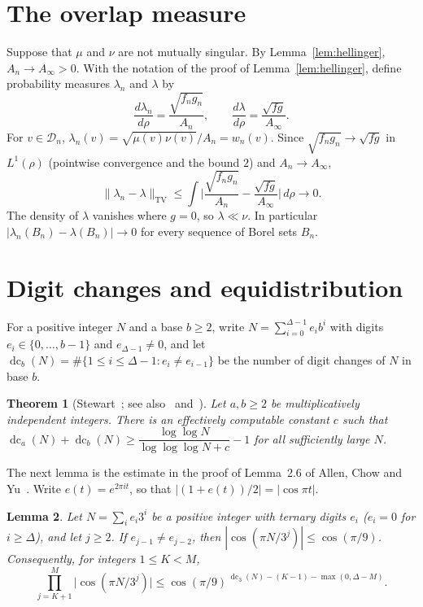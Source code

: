 \documentclass[11pt]{amsart}
\newtheorem{theorem}{Theorem}[section]
\newtheorem{lemma}[theorem]{Lemma}
\theoremstyle{remark}
\newcommand{\cD}{\mathcal D}
\newcommand{\TV}{\mathrm{TV}}
\DeclareMathOperator{\dc}{dc}
\begin{document}
\section{The overlap measure}\label{sec:overlap}

Suppose that $\mu$ and $\nu$ are not mutually singular. By Lemma~\ref{lem:hellinger}, $A_n\to A_\infty>0$. With the notation of the proof of Lemma~\ref{lem:hellinger}, define probability measures $\lambda_n$ and $\lambda$ by
\[
\frac{d\lambda_n}{d\rho}=\frac{\sqrt{f_ng_n}}{A_n},\qquad\frac{d\lambda}{d\rho}=\frac{\sqrt{fg}}{A_\infty}.
\]
For $v\in\cD_n$, $\lambda_n(v)=\sqrt{\mu(v)\nu(v)}/A_n=w_n(v)$. Since $\sqrt{f_ng_n}\to\sqrt{fg}$ in $L^1(\rho)$ (pointwise convergence and the bound $2$) and $A_n\to A_\infty$,
\begin{equation}\label{eq:tv}
\|\lambda_n-\lambda\|_{\TV}\le\int\Big|\frac{\sqrt{f_ng_n}}{A_n}-\frac{\sqrt{fg}}{A_\infty}\Big|\,d\rho\longrightarrow0.
\end{equation}
The density of $\lambda$ vanishes where $g=0$, so $\lambda\ll\nu$. In particular $|\lambda_n(B_n)-\lambda(B_n)|\to0$ for every sequence of Borel sets $B_n$.

\section{Digit changes and equidistribution}\label{sec:mixing}

For a positive integer $N$ and a base $b\ge2$, write $N=\sum_{i=0}^{\Delta-1}e_ib^i$ with digits $e_i\in\{0,\dots,b-1\}$ and $e_{\Delta-1}\ne0$, and let $\dc_b(N)=\#\{1\le i\le\Delta-1:e_i\ne e_{i-1}\}$ be the number of digit changes of $N$ in base $b$.

\begin{theorem}[{Stewart~\cite{Stewart}; see also~\cite{BCM} and~\cite[Theorem~6.9]{Bugeaud}}]\label{thm:stewart}
Let $a,b\ge2$ be multiplicatively independent integers. There is an effectively computable constant $c$ such that $\dc_a(N)+\dc_b(N)\ge\dfrac{\log\log N}{\log\log\log N+c}-1$ for all sufficiently large $N$.
\end{theorem}

The next lemma is the estimate in the proof of Lemma~2.6 of Allen, Chow and Yu~\cite{ACY}. Write $e(t)=e^{2\pi it}$, so that $|(1+e(t))/2|=|\cos\pi t|$.

\begin{lemma}\label{lem:digits}
Let $N=\sum_ie_i3^i$ be a positive integer with ternary digits $e_i$ \textup{(}$e_i=0$ for $i\ge\Delta$\textup{)}, and let $j\ge2$. If $e_{j-1}\ne e_{j-2}$, then $|\cos(\pi N/3^j)|\le\cos(\pi/9)$. Consequently, for integers $1\le K<M$,
\[
\prod_{j=K+1}^M\big|\cos(\pi N/3^j)\big|\le\cos(\pi/9)^{\,\dc_3(N)-(K-1)-\max(0,\Delta-M)}.
\]
\end{lemma}
\end{document}

